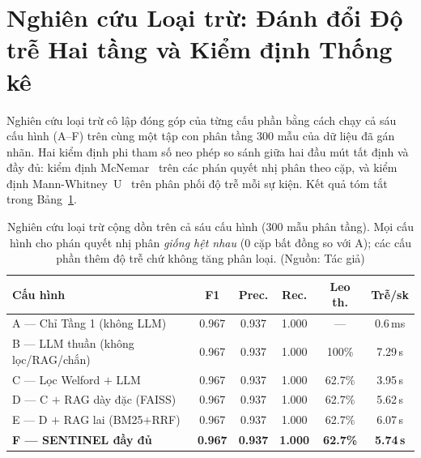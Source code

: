 \section{Nghiên cứu Loại trừ: Đánh đổi Độ trễ Hai tầng và Kiểm định Thống kê}
Nghiên cứu loại trừ cô lập đóng góp của từng cấu phần bằng cách chạy cả sáu cấu hình (A--F) trên cùng một tập con phân tầng 300 mẫu của dữ liệu đã gán nhãn. Hai kiểm định phi tham số neo phép so sánh giữa hai đầu mút tất định và đầy đủ: kiểm định McNemar~\cite{mcnemar1947} trên các phán quyết nhị phân theo cặp, và kiểm định Mann-Whitney~U~\cite{mannwhitney1947} trên phân phối độ trễ mỗi sự kiện. Kết quả tóm tắt trong Bảng~\ref{tab:ablation}.

\begin{table}[!htbp]
    \centering
    \footnotesize
    \setlength{\tabcolsep}{4pt}
    \caption{Nghiên cứu loại trừ cộng dồn trên cả sáu cấu hình (300 mẫu phân tầng). Mọi cấu hình cho phán quyết nhị phân \emph{giống hệt nhau} (0 cặp bất đồng so với A); các cấu phần thêm độ trễ chứ không tăng phân loại. (Nguồn: Tác giả)}
    \label{tab:ablation}
    \begin{tabular}{|>{\raggedright\arraybackslash}p{}|c|c|c|c|c|}
        \hline
        \textbf{Cấu hình} & \textbf{F1} & \textbf{Prec.} & \textbf{Rec.} & \textbf{Leo th.} & \textbf{Trễ/sk} \\
        \hline
        A --- Chỉ Tầng 1 (không LLM) & 0.967 & 0.937 & 1.000 & --- & 0.6\,ms \\
        \hline
        B --- LLM thuần (không lọc/RAG/chắn) & 0.967 & 0.937 & 1.000 & 100\% & 7.29\,s \\
        \hline
        C --- Lọc Welford $+$ LLM & 0.967 & 0.937 & 1.000 & 62.7\% & 3.95\,s \\
        \hline
        D --- C $+$ RAG dày đặc (FAISS) & 0.967 & 0.937 & 1.000 & 62.7\% & 5.62\,s \\
        \hline
        E --- D $+$ RAG lai (BM25$+$RRF) & 0.967 & 0.937 & 1.000 & 62.7\% & 6.07\,s \\
        \hline
        \textbf{F --- SENTINEL đầy đủ} & \textbf{0.967} & \textbf{0.937} & \textbf{1.000} & \textbf{62.7\%} & \textbf{5.74\,s} \\
        \hline
    \end{tabular}
\end{table}

